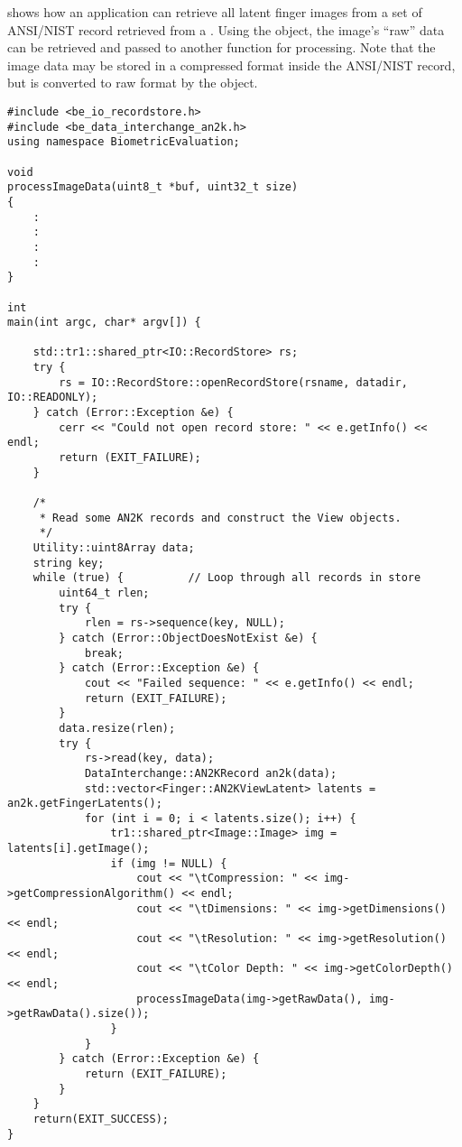 shows how an application can retrieve all latent
finger images from a set of ANSI/NIST record retrieved from a .
Using the  object, the image's ``raw'' data can be retrieved and passed
to another function for processing. Note that the image data may be stored
in a compressed format inside the ANSI/NIST record, but is converted to raw
format by the  object.

\begin{lstlisting}[caption={Retrieving ANSI/NIST Latent Records}, label=lst:an2klatentuse]
#include <be_io_recordstore.h>
#include <be_data_interchange_an2k.h>
using namespace BiometricEvaluation;

void
processImageData(uint8_t *buf, uint32_t size)
{
    :
    :
    :
    :
}

int
main(int argc, char* argv[]) {

    std::tr1::shared_ptr<IO::RecordStore> rs;
    try {
        rs = IO::RecordStore::openRecordStore(rsname, datadir, IO::READONLY);
    } catch (Error::Exception &e) {
        cerr << "Could not open record store: " << e.getInfo() << endl;
        return (EXIT_FAILURE);
    }

    /*
     * Read some AN2K records and construct the View objects.
     */
    Utility::uint8Array data;
    string key;
    while (true) {          // Loop through all records in store
        uint64_t rlen;
        try {
            rlen = rs->sequence(key, NULL);
        } catch (Error::ObjectDoesNotExist &e) {
            break;
        } catch (Error::Exception &e) {
            cout << "Failed sequence: " << e.getInfo() << endl;
            return (EXIT_FAILURE);
        }
        data.resize(rlen);
        try {
            rs->read(key, data);
            DataInterchange::AN2KRecord an2k(data);
            std::vector<Finger::AN2KViewLatent> latents = an2k.getFingerLatents();
            for (int i = 0; i < latents.size(); i++) {
                tr1::shared_ptr<Image::Image> img = latents[i].getImage();
                if (img != NULL) {
                    cout << "\tCompression: " << img->getCompressionAlgorithm() << endl;
                    cout << "\tDimensions: " << img->getDimensions() << endl;
                    cout << "\tResolution: " << img->getResolution() << endl;
                    cout << "\tColor Depth: " << img->getColorDepth() << endl;
                    processImageData(img->getRawData(), img->getRawData().size());
                }
            }
        } catch (Error::Exception &e) {
            return (EXIT_FAILURE);
        }
    }
    return(EXIT_SUCCESS);
}
\end{lstlisting}

